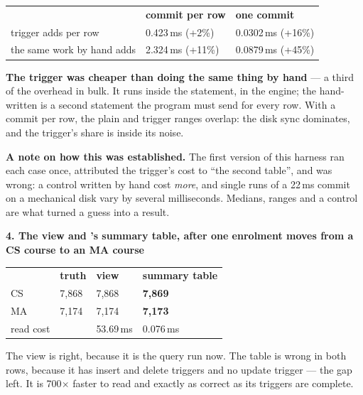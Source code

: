 \begin{measured}
\smallskip
\begin{tabular}{@{}L{6.2cm}R{3.6cm}R{4.0cm}@{}}
& \textbf{commit per row} & \textbf{one commit} \\
trigger adds per row & 0.423\,ms (+2\%) & 0.0302\,ms (+16\%) \\
the same work by hand adds & 2.324\,ms (+11\%) & 0.0879\,ms (+45\%) \\
\end{tabular}

\smallskip
\textbf{The trigger was cheaper than doing the same thing by hand} --- a third
of the overhead in bulk. It runs inside the  statement, in the
engine; the hand-written  is a second statement the program must
send for every row. With a commit per row, the plain and trigger ranges
overlap: the disk sync dominates, and the trigger's share is inside its noise.

\smallskip
\textbf{A note on how this was established.} The first version of this
harness ran each case once, attributed the trigger's cost to ``the second
table'', and was wrong: a control written by hand cost \emph{more}, and single
runs of a 22\,ms commit on a mechanical disk vary by several milliseconds.
Medians, ranges and a control are what turned a guess into a result.

\medskip
\textbf{4. The view and 's summary table, after one
enrolment moves from a CS course to an MA course}

\begin{tabular}{@{}L{3.0cm}R{2.4cm}R{2.4cm}R{2.8cm}@{}}
& \textbf{truth} & \textbf{view} & \textbf{summary table} \\
CS & 7{,}868 & 7{,}868 & \textbf{7{,}869} \\
MA & 7{,}174 & 7{,}174 & \textbf{7{,}173} \\
read cost & & 53.69\,ms & 0.076\,ms \\
\end{tabular}

\smallskip
The view is right, because it is the query run now. The table is wrong in both
rows, because it has insert and delete triggers and no update trigger --- the
gap  left. It is 700$\times$ faster to read and exactly as
correct as its triggers are complete.
\end{measured}

